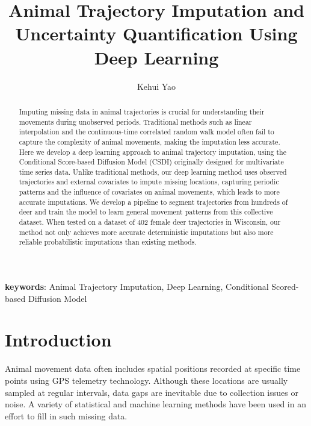 \documentclass[11pt]{article}
\title{Animal Trajectory Imputation and Uncertainty Quantification Using Deep Learning}
\author[1]{Kehui Yao}
\affil[1]{Department of Statistics, University of Wisconsin-Madison}
\date{}
\begin{document}
\maketitle

\begin{abstract}
Imputing missing data in animal trajectories is crucial for understanding their movements during unobserved periods. Traditional methods such as linear interpolation and the continuous-time correlated random walk model often fail to capture the complexity of animal movements, making the imputation less accurate. Here we develop a deep learning approach to animal trajectory imputation, using the Conditional Score-based Diffusion Model (CSDI) originally designed for multivariate time series data. Unlike traditional methods, our deep learning method uses observed trajectories and external covariates to impute missing locations, capturing periodic patterns and the influence of covariates on animal movements, which leads to more accurate imputations. We develop a pipeline to segment trajectories from hundreds of deer and train the model to learn general movement patterns from this collective dataset. When tested on a dataset of 402 female deer trajectories in Wisconsin, our method not only achieves more accurate deterministic imputations but also more reliable probabilistic imputations than existing methods.

\end{abstract}

\textbf{keywords}: Animal Trajectory Imputation, Deep Learning, Conditional Scored-based Diffusion Model
\section{Introduction}
Animal movement data often includes spatial positions recorded at specific time points using GPS telemetry technology. Although these locations are usually sampled at regular intervals, data gaps are inevitable due to collection issues or noise. A variety of statistical and machine learning methods have been used in an effort to fill in such missing data.
\end{document}
